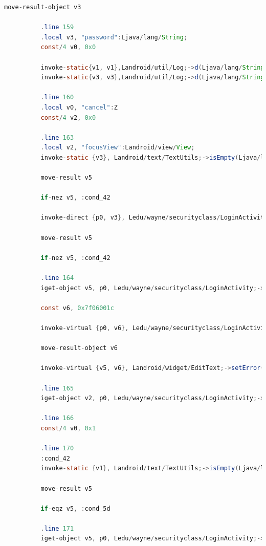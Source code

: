 \documentclass[onecolumn,oneside]{SUSTechHomework}
\begin{document}
\begin{lstlisting}[language={java}]
          move-result-object v3
      
          .line 159
          .local v3, "password":Ljava/lang/String;
          const/4 v0, 0x0
      
          invoke-static{v1, v1},Landroid/util/Log;->d(Ljava/lang/String;Ljava/lang/String;)I
          invoke-static{v3, v3},Landroid/util/Log;->d(Ljava/lang/String;Ljava/lang/String;)I
      
          .line 160
          .local v0, "cancel":Z
          const/4 v2, 0x0
      
          .line 163
          .local v2, "focusView":Landroid/view/View;
          invoke-static {v3}, Landroid/text/TextUtils;->isEmpty(Ljava/lang/CharSequence;)Z
      
          move-result v5
      
          if-nez v5, :cond_42
      
          invoke-direct {p0, v3}, Ledu/wayne/securityclass/LoginActivity;->isPasswordValid(Ljava/lang/String;)Z
      
          move-result v5
      
          if-nez v5, :cond_42
      
          .line 164
          iget-object v5, p0, Ledu/wayne/securityclass/LoginActivity;->mPasswordView:Landroid/widget/EditText;
      
          const v6, 0x7f06001c
      
          invoke-virtual {p0, v6}, Ledu/wayne/securityclass/LoginActivity;->getString(I)Ljava/lang/String;
      
          move-result-object v6
      
          invoke-virtual {v5, v6}, Landroid/widget/EditText;->setError(Ljava/lang/CharSequence;)V
      
          .line 165
          iget-object v2, p0, Ledu/wayne/securityclass/LoginActivity;->mPasswordView:Landroid/widget/EditText;
      
          .line 166
          const/4 v0, 0x1
      
          .line 170
          :cond_42
          invoke-static {v1}, Landroid/text/TextUtils;->isEmpty(Ljava/lang/CharSequence;)Z
      
          move-result v5
      
          if-eqz v5, :cond_5d
      
          .line 171
          iget-object v5, p0, Ledu/wayne/securityclass/LoginActivity;->mEmailView:Landroid/widget/AutoCompleteTextView;
      

\end{lstlisting}
\end{document}
